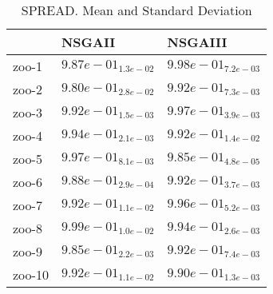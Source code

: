 \documentclass{article}
\begin{document}
\begin{table}
\caption{SPREAD. Mean and Standard Deviation}
\label{table: SPREAD}
\centering
\begin{scriptsize}
\begin{tabular}{lll}
\hline & NSGAII &  NSGAIII\\
\hline 
zoo-1 & \cellcolor{gray95}$  9.87e-01_{ 1.3e-02}$ & \cellcolor{gray25}$  9.98e-01_{ 7.2e-03}$ \\
zoo-2 & \cellcolor{gray95}$  9.80e-01_{ 2.8e-02}$ & \cellcolor{gray25}$  9.92e-01_{ 7.3e-03}$ \\
zoo-3 & \cellcolor{gray95}$  9.92e-01_{ 1.5e-03}$ & \cellcolor{gray25}$  9.97e-01_{ 3.9e-03}$ \\
zoo-4 & \cellcolor{gray25}$  9.94e-01_{ 2.1e-03}$ & \cellcolor{gray95}$  9.92e-01_{ 1.4e-02}$ \\
zoo-5 & \cellcolor{gray25}$  9.97e-01_{ 8.1e-03}$ & \cellcolor{gray95}$  9.85e-01_{ 4.8e-05}$ \\
zoo-6 & \cellcolor{gray95}$  9.88e-01_{ 2.9e-04}$ & \cellcolor{gray25}$  9.92e-01_{ 3.7e-03}$ \\
zoo-7 & \cellcolor{gray95}$  9.92e-01_{ 1.1e-02}$ & \cellcolor{gray25}$  9.96e-01_{ 5.2e-03}$ \\
zoo-8 & \cellcolor{gray25}$  9.99e-01_{ 1.0e-02}$ & \cellcolor{gray95}$  9.94e-01_{ 2.6e-03}$ \\
zoo-9 & \cellcolor{gray95}$  9.85e-01_{ 2.2e-03}$ & \cellcolor{gray25}$  9.92e-01_{ 7.4e-03}$ \\
zoo-10 & \cellcolor{gray25}$  9.92e-01_{ 1.1e-02}$ & \cellcolor{gray95}$  9.90e-01_{ 1.3e-03}$ \\
\hline
\end{tabular}
\end{scriptsize}
\end{table}
\end{document}
